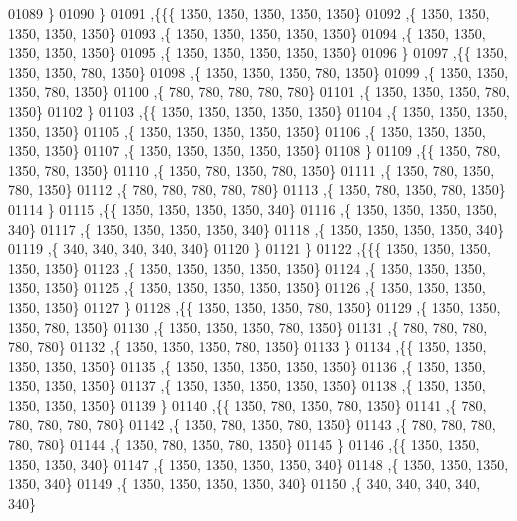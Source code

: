 \begin{DoxyCode}
01089    \}
01090   \}
01091  ,\{\{\{  1350,  1350,  1350,  1350,  1350\}
01092    ,\{  1350,  1350,  1350,  1350,  1350\}
01093    ,\{  1350,  1350,  1350,  1350,  1350\}
01094    ,\{  1350,  1350,  1350,  1350,  1350\}
01095    ,\{  1350,  1350,  1350,  1350,  1350\}
01096    \}
01097   ,\{\{  1350,  1350,  1350,   780,  1350\}
01098    ,\{  1350,  1350,  1350,   780,  1350\}
01099    ,\{  1350,  1350,  1350,   780,  1350\}
01100    ,\{   780,   780,   780,   780,   780\}
01101    ,\{  1350,  1350,  1350,   780,  1350\}
01102    \}
01103   ,\{\{  1350,  1350,  1350,  1350,  1350\}
01104    ,\{  1350,  1350,  1350,  1350,  1350\}
01105    ,\{  1350,  1350,  1350,  1350,  1350\}
01106    ,\{  1350,  1350,  1350,  1350,  1350\}
01107    ,\{  1350,  1350,  1350,  1350,  1350\}
01108    \}
01109   ,\{\{  1350,   780,  1350,   780,  1350\}
01110    ,\{  1350,   780,  1350,   780,  1350\}
01111    ,\{  1350,   780,  1350,   780,  1350\}
01112    ,\{   780,   780,   780,   780,   780\}
01113    ,\{  1350,   780,  1350,   780,  1350\}
01114    \}
01115   ,\{\{  1350,  1350,  1350,  1350,   340\}
01116    ,\{  1350,  1350,  1350,  1350,   340\}
01117    ,\{  1350,  1350,  1350,  1350,   340\}
01118    ,\{  1350,  1350,  1350,  1350,   340\}
01119    ,\{   340,   340,   340,   340,   340\}
01120    \}
01121   \}
01122  ,\{\{\{  1350,  1350,  1350,  1350,  1350\}
01123    ,\{  1350,  1350,  1350,  1350,  1350\}
01124    ,\{  1350,  1350,  1350,  1350,  1350\}
01125    ,\{  1350,  1350,  1350,  1350,  1350\}
01126    ,\{  1350,  1350,  1350,  1350,  1350\}
01127    \}
01128   ,\{\{  1350,  1350,  1350,   780,  1350\}
01129    ,\{  1350,  1350,  1350,   780,  1350\}
01130    ,\{  1350,  1350,  1350,   780,  1350\}
01131    ,\{   780,   780,   780,   780,   780\}
01132    ,\{  1350,  1350,  1350,   780,  1350\}
01133    \}
01134   ,\{\{  1350,  1350,  1350,  1350,  1350\}
01135    ,\{  1350,  1350,  1350,  1350,  1350\}
01136    ,\{  1350,  1350,  1350,  1350,  1350\}
01137    ,\{  1350,  1350,  1350,  1350,  1350\}
01138    ,\{  1350,  1350,  1350,  1350,  1350\}
01139    \}
01140   ,\{\{  1350,   780,  1350,   780,  1350\}
01141    ,\{   780,   780,   780,   780,   780\}
01142    ,\{  1350,   780,  1350,   780,  1350\}
01143    ,\{   780,   780,   780,   780,   780\}
01144    ,\{  1350,   780,  1350,   780,  1350\}
01145    \}
01146   ,\{\{  1350,  1350,  1350,  1350,   340\}
01147    ,\{  1350,  1350,  1350,  1350,   340\}
01148    ,\{  1350,  1350,  1350,  1350,   340\}
01149    ,\{  1350,  1350,  1350,  1350,   340\}
01150    ,\{   340,   340,   340,   340,   340\}

\end{DoxyCode}

